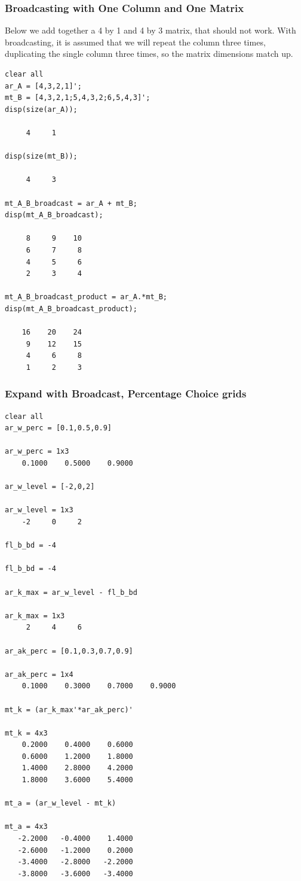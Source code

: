 \documentclass[
]{book}
\begin{document}
\hypertarget{broadcasting-with-one-column-and-one-matrix}{%
\subsubsection{Broadcasting with One Column and One Matrix}\label{broadcasting-with-one-column-and-one-matrix}}

Below we add together a 4 by 1 and 4 by 3 matrix, that should not work.
With broadcasting, it is assumed that we will repeat the column three
times, duplicating the single column three times, so the matrix
dimensions match up.

\begin{verbatim}
clear all
ar_A = [4,3,2,1]';
mt_B = [4,3,2,1;5,4,3,2;6,5,4,3]';
disp(size(ar_A));

     4     1

disp(size(mt_B));

     4     3

mt_A_B_broadcast = ar_A + mt_B;
disp(mt_A_B_broadcast);

     8     9    10
     6     7     8
     4     5     6
     2     3     4

mt_A_B_broadcast_product = ar_A.*mt_B;
disp(mt_A_B_broadcast_product);

    16    20    24
     9    12    15
     4     6     8
     1     2     3
\end{verbatim}

\hypertarget{expand-with-broadcast-percentage-choice-grids}{%
\subsubsection{Expand with Broadcast, Percentage Choice grids}\label{expand-with-broadcast-percentage-choice-grids}}

\begin{verbatim}
clear all
ar_w_perc = [0.1,0.5,0.9]

ar_w_perc = 1x3    
    0.1000    0.5000    0.9000

ar_w_level = [-2,0,2]

ar_w_level = 1x3    
    -2     0     2

fl_b_bd = -4

fl_b_bd = -4

ar_k_max = ar_w_level - fl_b_bd

ar_k_max = 1x3    
     2     4     6

ar_ak_perc = [0.1,0.3,0.7,0.9]

ar_ak_perc = 1x4    
    0.1000    0.3000    0.7000    0.9000

mt_k = (ar_k_max'*ar_ak_perc)'

mt_k = 4x3    
    0.2000    0.4000    0.6000
    0.6000    1.2000    1.8000
    1.4000    2.8000    4.2000
    1.8000    3.6000    5.4000

mt_a = (ar_w_level - mt_k)

mt_a = 4x3    
   -2.2000   -0.4000    1.4000
   -2.6000   -1.2000    0.2000
   -3.4000   -2.8000   -2.2000
   -3.8000   -3.6000   -3.4000
\end{verbatim}
\end{document}
